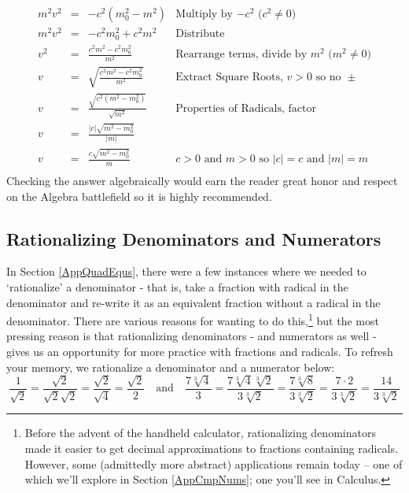 \documentclass{ximera}
\begin{document}
\begin{example}
\begin{explanation}
\begin{enumerate}
\[\begin{array}{rclr}
m^2 v^2 & = & -c^2 (m_0^{2} - m^2)  & \text{Multiply by $-c^2$ ($c^2 \neq 0$)} \\  

m^2 v^2 & = & -c^2m_0^{2} + c^2 m^2 & \text{Distribute} \\ 

v^2  & = & \frac{c^2 m^2 -c^2m_0^{2}}{m^2} & \text{Rearrange terms, divide by $m^2$ ($m^2 \neq 0$)} \\ 

v & = & \sqrt{\frac{c^2 m^2 -c^2m_0^{2}}{m^2}} & \text{Extract Square Roots, $v > 0$ so no $\pm$} \\ 

v & = & \frac{\sqrt{c^2 (m^2 -m_0^{2})}}{\sqrt{m^2}} & \text{Properties of Radicals, factor} \\ 

v & = & \frac{|c|\sqrt{m^2 -m_0^{2}}}{|m|} &  \\ 

v & = & \frac{c\sqrt{m^2 -m_0^{2}}}{m} & \text{$c > 0$ and $m > 0$ so $|c| = c$ and $|m| = m$} \\

\end{array}\] Checking the answer algebraically would earn the reader great honor and respect on the Algebra battlefield so it is highly recommended.

\end{enumerate}
\end{explanation}
\end{example}

\subsection{Rationalizing Denominators and Numerators}
\label{rationalizingdenomandnumer}

In Section \ref{AppQuadEqus}, there were a few instances where we needed to `rationalize' a denominator - that is, take a fraction with radical in the denominator and re-write it as an equivalent fraction without a radical in the denominator.  There are various reasons for wanting to do this,\footnote{Before the advent of the handheld calculator, rationalizing denominators made it easier to get decimal approximations to fractions containing radicals.   However, some (admittedly more abstract) applications remain today --  one of which we'll explore in Section \ref{AppCmpNums}; one you'll see in Calculus.} but the most pressing reason is that rationalizing denominators - and numerators as well - gives us an opportunity for more practice with fractions and radicals. To refresh your memory, we rationalize a denominator and a numerator below: \[ \frac{1}{\sqrt{2}} = \frac{\sqrt{2}}{\sqrt{2} \sqrt{2}} = \frac{\sqrt{2}}{\sqrt{4}} = \frac{\sqrt{2}}{2} \quad \text{and} \quad \frac{7\sqrt[3]{4}}{3} = \frac{7 \sqrt[3]{4}\sqrt[3]{2}}{3\sqrt[3]{2}} = \frac{7\sqrt[3]{8}}{3\sqrt[3]{2}} = \frac{7 \cdot 2}{3\sqrt[3]{2}} =  \frac{14}{3\sqrt[3]{2}} \]
\end{document}
